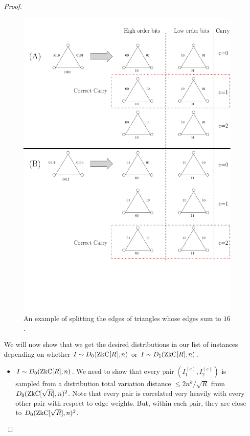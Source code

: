 \begin{proof}
	\begin{figure}[h]
		\centering
		\includegraphics[scale=0.55]{fgcrypto/SplittableFig.pdf}
		\caption{An example of splitting the edges of triangles whose edges sum to $16$.}
		\label{fig:splittableRed}
	\end{figure}

	We will now show that we get the desired distributions in our list of instances depending on whether $I \sim D_0(\ZkC[R], n)$ or $I \sim D_1(\ZkC[R], n)$.
	\begin{itemize}
		\item $I \sim D_0(\ZkC[R], n)$. We need to show that every pair $(I_1^{(c)}, I_2^{(c)})$ is sampled from a distribution total variation distance $\le 2n^k/\sqrt R$ from $D_0(\ZkC[\sqrt R], n)^2$. Note that every pair is correlated very heavily with every other pair with respect to edge weights. But, within each pair, they are close to $D_0(\ZkC[\sqrt R], n)^2$.
		

\end{itemize}
\end{proof}
